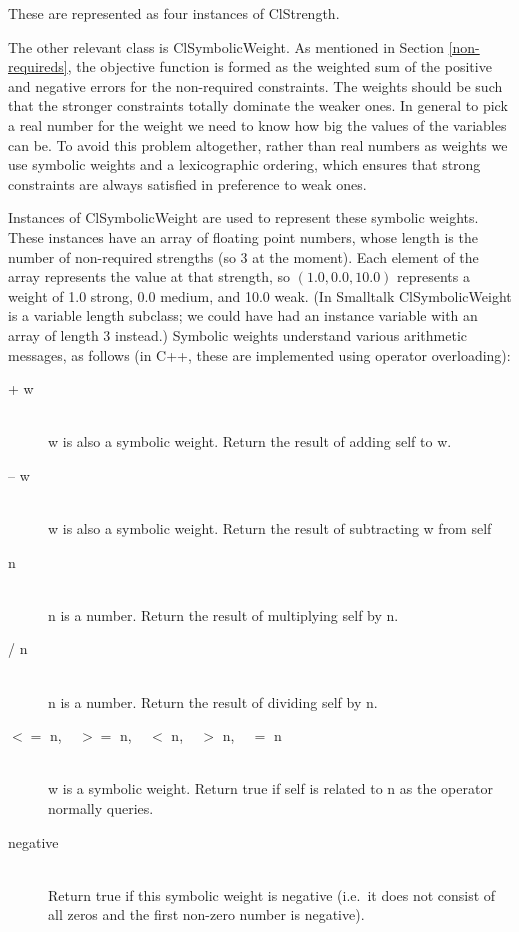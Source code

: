 \documentclass{article}
\begin{document}
These are represented as four instances of {\sf ClStrength}.

The other relevant class is {\sf ClSymbolicWeight}.  As mentioned in
Section \ref{non-requireds}, the objective function is formed as the
weighted sum of the positive and negative errors for the non-required
constraints.  The weights should be such that the stronger constraints
totally dominate the weaker ones.  In general to pick a real number for the
weight we need to know how big the values of the variables can be.  To
avoid this problem altogether, rather than real numbers as weights we use
symbolic weights and a lexicographic ordering, which ensures that strong
constraints are always satisfied in preference to weak ones.  

Instances of {\sf ClSymbolicWeight} are used to represent these symbolic
weights.  These instances have an array of floating point numbers, whose
length is the number of non-required strengths (so 3 at the moment).  Each
element of the array represents the value at that strength, so $(1.0, 0.0,
10.0)$ represents a weight of 1.0 {\sf strong}, 0.0 {\sf medium}, and 10.0
{\sf weak}.  (In Smalltalk {\sf ClSymbolicWeight} is a variable length
subclass; we could have had an instance variable with an array of length 3
instead.)   Symbolic weights understand various arithmetic messages, as
follows (in C++, these are implemented using operator overloading):

\begin{description}

\item[{\sf + w}]  \ \\
{\sf w} is also a symbolic weight.
Return the result of adding {\sf self} to {\sf w}.  

\item[{\sf -- w}] \ \\
{\sf w} is also a symbolic weight.
Return the result of subtracting {\sf w} from {\sf self}

\item[{\sf * n}] \ \\
{\sf n} is a number.
Return the result of multiplying {\sf self} by {\sf n}.  

\item[{\sf / n}] \ \\
{\sf n} is a number.
Return the result of dividing {\sf self} by {\sf n}.  

\item[$<=$ {\sf  n}, ~ $>=$ {\sf n}, ~ $<$ {\sf n}, ~ $>$ {\sf n}, ~ $=$ {\sf n}] \ \\
{\sf w} is a symbolic weight.
Return true if {\sf self} is related to {\sf n} as the operator normally
queries.

\item[{\sf negative}] \ \\
Return true if this symbolic weight is negative
(i.e.\ it does not consist of all zeros and the first non-zero number is
negative). 

\end{description}
\end{document}
